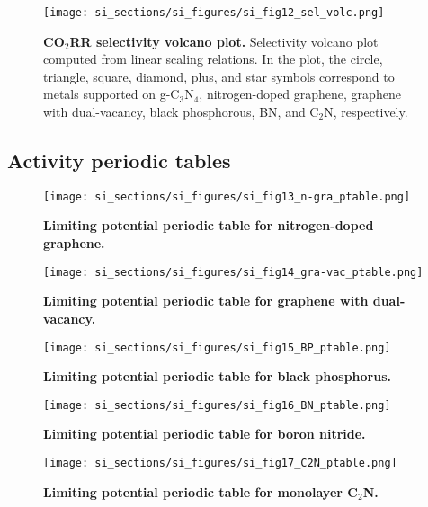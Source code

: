 \begin{figure}
  \centering
  \texttt{[image: si\_sections/si\_figures/si\_fig12\_sel\_volc.png]}
  \caption{\textbf{CO$_2$RR selectivity volcano plot.}
  Selectivity volcano plot computed from linear scaling relations.
  In the plot, the circle, triangle, square, diamond, plus, and star symbols correspond to
  metals supported on g-C$_3$N$_4$, nitrogen-doped graphene, graphene with dual-vacancy,
  black phosphorous, BN, and C$_2$N, respectively.}
  \label{si_fig12:sel_volc}
\end{figure}


\subsection{Activity periodic tables}


\begin{figure}
  \centering
  \texttt{[image: si\_sections/si\_figures/si\_fig13\_n-gra\_ptable.png]}
  \caption{\textbf{Limiting potential periodic table for nitrogen-doped graphene.}}
  \label{si_fig13:n-gra_ptable}
\end{figure}


\begin{figure}
  \centering
  \texttt{[image: si\_sections/si\_figures/si\_fig14\_gra-vac\_ptable.png]}
  \caption{\textbf{Limiting potential periodic table for graphene with dual-vacancy.}}
  \label{si_fig14:gra-vac_ptable}
\end{figure}


\begin{figure}
  \centering
  \texttt{[image: si\_sections/si\_figures/si\_fig15\_BP\_ptable.png]}
  \caption{\textbf{Limiting potential periodic table for black phosphorus.}}
  \label{si_fig15:BP_ptable}
\end{figure}


\begin{figure}
  \centering
  \texttt{[image: si\_sections/si\_figures/si\_fig16\_BN\_ptable.png]}
  \caption{\textbf{Limiting potential periodic table for boron nitride.}}
  \label{si_fig16:BN_ptable}
\end{figure}


\begin{figure}
  \centering
  \texttt{[image: si\_sections/si\_figures/si\_fig17\_C2N\_ptable.png]}
  \caption{\textbf{Limiting potential periodic table for monolayer C$_2$N.}}
  \label{si_fig17:C2N_ptable}
\end{figure}

